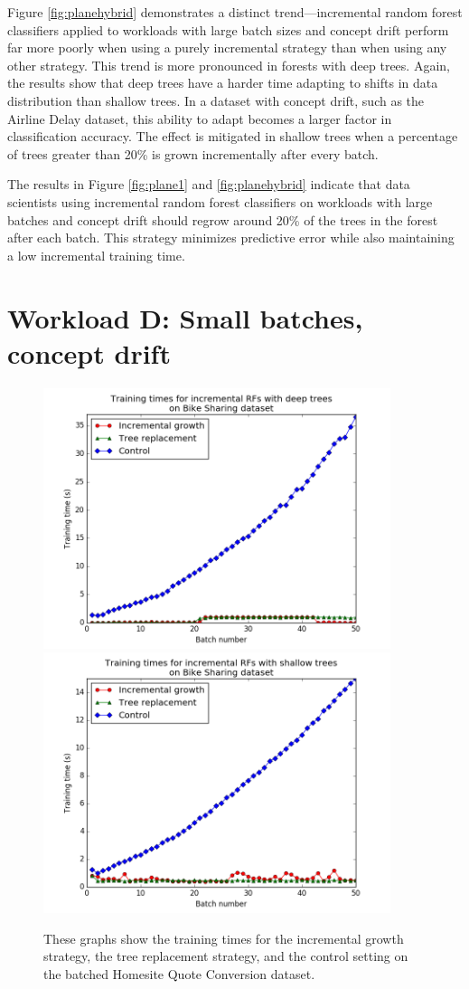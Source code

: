Figure \ref{fig:planehybrid} demonstrates a distinct trend---incremental random
forest classifiers applied to workloads with large batch sizes and concept
drift perform far more poorly when using a purely incremental strategy than
when using any other strategy. This trend is more pronounced in forests with
deep trees. Again, the results show that deep trees have a harder time adapting
to shifts in data distribution than shallow trees. In a dataset with concept
drift, such as the Airline Delay dataset, this ability to adapt becomes a
larger factor in classification accuracy. The effect is mitigated in shallow
trees when a percentage of trees greater than 20\% is grown incrementally after
every batch.

The results in Figure \ref{fig:plane1} and \ref{fig:planehybrid} indicate that data
scientists using incremental random forest classifiers on workloads with large
batches and concept drift should regrow around 20\% of the trees in the forest
after each batch. This strategy minimizes predictive error while also
maintaining a low incremental training time.


\section{Workload D: Small batches, concept drift}

\begin{figure}
  \centering
  \includegraphics[width=4.0in]{deep_bikeshare_time}\\
  \includegraphics[width=4.0in]{shallow_bikeshare_time}
  \caption{These graphs show the training times for the
  incremental growth strategy, the tree replacement strategy, and the control
setting on the batched Homesite Quote Conversion dataset.}
  \label{fig:bikeshare1}
\end{figure}

